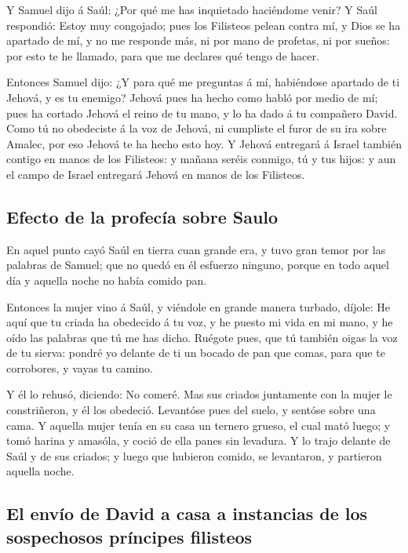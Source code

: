  Y Samuel dijo á Saúl: ¿Por qué me has inquietado
haciéndome venir? Y Saúl respondió: Estoy muy congojado; pues los
Filisteos pelean contra mí, y Dios se ha apartado de mí, y no me
responde más, ni por mano de profetas, ni por sueños: por esto te he
llamado, para que me declares qué tengo de hacer.

 Entonces Samuel dijo: ¿Y para qué me preguntas á mí,
habiéndose apartado de ti Jehová, y es tu enemigo?  Jehová
pues ha hecho como habló por medio de mí; pues ha cortado Jehová el
reino de tu mano, y lo ha dado á tu compañero David.  Como
tú no obedeciste á la voz de Jehová, ni cumpliste el furor de su ira
sobre Amalec, por eso Jehová te ha hecho esto hoy.  Y
Jehová entregará á Israel también contigo en manos de los Filisteos: y
mañana seréis conmigo, tú y tus hijos: y aun el campo de Israel
entregará Jehová en manos de los Filisteos.

\hypertarget{efecto-de-la-profecuxeda-sobre-saulo}{%
\subsection{Efecto de la profecía sobre
Saulo}\label{efecto-de-la-profecuxeda-sobre-saulo}}

 En aquel punto cayó Saúl en tierra cuan grande era, y tuvo
gran temor por las palabras de Samuel; que no quedó en él esfuerzo
ninguno, porque en todo aquel día y aquella noche no había comido pan.

 Entonces la mujer vino á Saúl, y viéndole en grande manera
turbado, díjole: He aquí que tu criada ha obedecido á tu voz, y he
puesto mi vida en mi mano, y he oído las palabras que tú me has dicho.
 Ruégote pues, que tú también oigas la voz de tu sierva:
pondré yo delante de ti un bocado de pan que comas, para que te
corrobores, y vayas tu camino.

 Y él lo rehusó, diciendo: No comeré. Mas sus criados
juntamente con la mujer le constriñeron, y él los obedeció. Levantóse
pues del suelo, y sentóse sobre una cama.  Y aquella mujer
tenía en su casa un ternero grueso, el cual mató luego; y tomó harina y
amasóla, y coció de ella panes sin levadura.  Y lo trajo
delante de Saúl y de sus criados; y luego que hubieron comido, se
levantaron, y partieron aquella noche.

\hypertarget{el-envuxedo-de-david-a-casa-a-instancias-de-los-sospechosos-pruxedncipes-filisteos}{%
\subsection{El envío de David a casa a instancias de los sospechosos
príncipes
filisteos}\label{el-envuxedo-de-david-a-casa-a-instancias-de-los-sospechosos-pruxedncipes-filisteos}}

